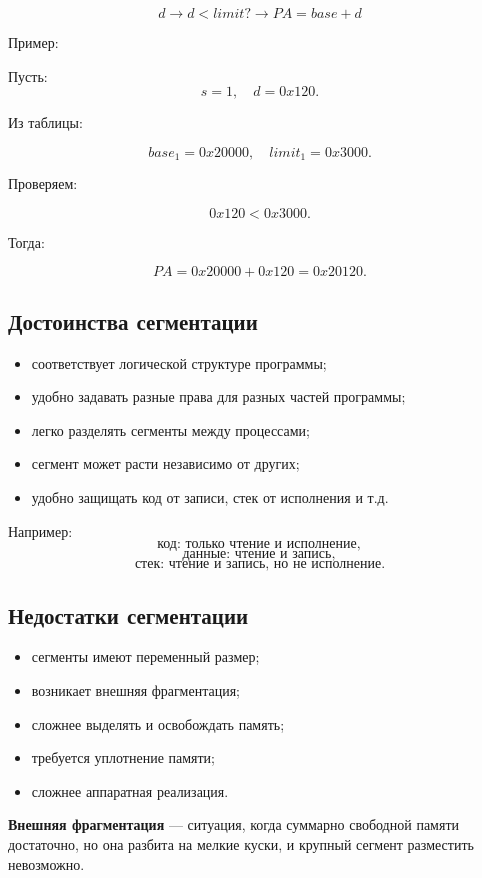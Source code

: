 \documentclass[12pt,a4paper]{article}
\theoremstyle{remark}
\begin{document}
\[
\boxed{d}
\rightarrow
\boxed{d < limit?}
\rightarrow
\boxed{PA = base + d}
\]

Пример:

Пусть:
\[
s = 1,\quad d = 0x120.
\]

Из таблицы:

\[
base_1 = 0x20000,\quad limit_1 = 0x3000.
\]

Проверяем:

\[
0x120 < 0x3000.
\]

Тогда:

\[
PA = 0x20000 + 0x120 = 0x20120.
\]

\subsection{Достоинства сегментации}

\begin{itemize}
    \item соответствует логической структуре программы;
    \item удобно задавать разные права для разных частей программы;
    \item легко разделять сегменты между процессами;
    \item сегмент может расти независимо от других;
    \item удобно защищать код от записи, стек от исполнения и т.д.
\end{itemize}

Например:
\[
\text{код: только чтение и исполнение},
\]
\[
\text{данные: чтение и запись},
\]
\[
\text{стек: чтение и запись, но не исполнение}.
\]

\subsection{Недостатки сегментации}

\begin{itemize}
    \item сегменты имеют переменный размер;
    \item возникает внешняя фрагментация;
    \item сложнее выделять и освобождать память;
    \item требуется уплотнение памяти;
    \item сложнее аппаратная реализация.
\end{itemize}

\textbf{Внешняя фрагментация} --- ситуация, когда суммарно свободной памяти достаточно, но она разбита на мелкие куски, и крупный сегмент разместить невозможно.
\end{document}
